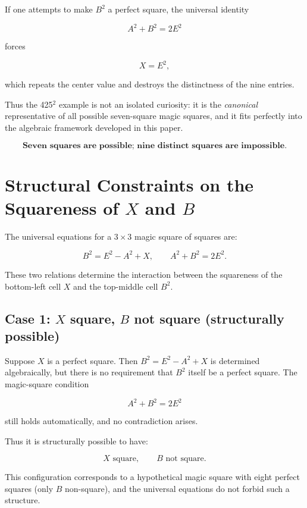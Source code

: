 \documentclass[12pt]{article}
\begin{document}
If one attempts to make $B^2$ a perfect square, the universal identity


\[
A^2 + B^2 = 2E^2
\]


forces


\[
X = E^2,
\]


which repeats the center value and destroys the distinctness of the nine
entries.

Thus the 425$^2$ example is not an isolated curiosity: it is the
\emph{canonical} representative of all possible seven-square magic
squares, and it fits perfectly into the algebraic framework developed in
this paper.



\[
\textbf{Seven squares are possible; nine distinct squares are impossible.}
\]

\section*{Structural Constraints on the Squareness of $X$ and $B$}

The universal equations for a $3\times 3$ magic square of squares are:


\[
B^2 = E^2 - A^2 + X,
\qquad
A^2 + B^2 = 2E^2.
\]



These two relations determine the interaction between the squareness of
the bottom-left cell $X$ and the top-middle cell $B^2$.

\subsection*{Case 1: $X$ square, $B$ not square (structurally possible)}

Suppose $X$ is a perfect square.  
Then $B^2 = E^2 - A^2 + X$ is determined algebraically, but there is no
requirement that $B^2$ itself be a perfect square.  
The magic-square condition


\[
A^2 + B^2 = 2E^2
\]


still holds automatically, and no contradiction arises.

Thus it is structurally possible to have:


\[
X \text{ square}, \qquad B \text{ not square}.
\]



This configuration corresponds to a hypothetical magic square with eight
perfect squares (only $B$ non-square), and the universal equations do not
forbid such a structure.
\end{document}
